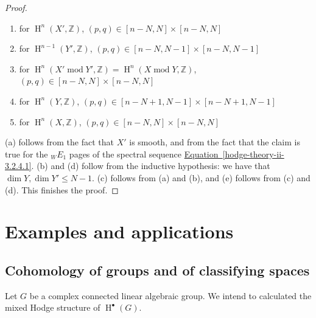 \begin{proof}
      
 \begin{enumerate}
        
 \item[(a)]
          for \(\operatorname {H}^n(X',\mathbb {Z})\), \((p,q)\in [n-N,N]\times [n-N,N]\)
        


        
 \item[(b)]
          for \(\operatorname {H}^{n-1}(Y',\mathbb {Z})\), \((p,q)\in [n-N,N-1]\times [n-N,N-1]\)
        


        
 \item[(c)]
          for \(\operatorname {H}^n(X'\operatorname {mod} Y',\mathbb {Z})=\operatorname {H}^n(X\operatorname {mod} Y,\mathbb {Z})\), \((p,q)\in [n-N,N]\times [n-N,N]\)
        


        
 \item[(d)]
          for \(\operatorname {H}^n(Y,\mathbb {Z})\), \((p,q)\in [n-N+1,N-1]\times [n-N+1,N-1]\)
        


        
 \item[(e)]
          for \(\operatorname {H}^n(X,\mathbb {Z})\), \((p,q)\in [n-N,N]\times [n-N,N]\)
        

      \end{enumerate}


      (a) follows from the fact that \(X'\) is smooth, and from the fact that the claim is true for the \({}_WE_1\) pages of the spectral sequence \hyperref[hodge-theory-ii-3.2.4.1]{Equation~\ref*{hodge-theory-ii-3.2.4.1}}.
      (b) and (d) follow from the inductive hypothesis: we have that \(\dim  Y,\dim  Y'\leqslant  N-1\).
      (c) follows from (a) and (b), and (e) follows from (c) and (d).
      This finishes the proof.\end{proof}\chapter{Examples and applications}\thispagestyle{fancy}\label{hodge-theory-iii-9}\section{Cohomology of groups and of classifying spaces}\label{hodge-theory-iii-9.1}\par{}Let \(G\) be a complex connected linear algebraic group.
  We intend to calculated the mixed Hodge structure of \(\operatorname {H}^\bullet (G)\).
